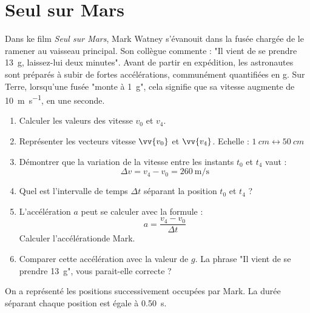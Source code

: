 \documentclass[a4paper,12pt,fleqn]{scrartcl}%
\begin{document}
\newpage
\section{Seul sur Mars}
Dans ke film \textit{Seul sur Mars}, Mark Watney s'évanouit dans la fusée chargée de le ramener au vaisseau principal. Son collègue commente : "Il vient de se prendre \SI{13}{g}, laissez-lui deux minutes". Avant de partir en expédition, les astronautes sont préparés à subir de fortes accélérations, communément quantifiées en \unit{\gram}. Sur Terre, lorsqu'une fusée "monte à \SI{1}{g}", cela signifie que sa vitesse augmente de \SI{10}{\meter\per\second}, en une seconde.

\begin{question}
    \begin{minipage}{.48\linewidth}
        \begin{enumerate}
            \item Calculer les valeurs des vitesse $v_0$ et $v_4$.
            \item Représenter les vecteurs vitesse $\vv{v_0}$ et $\vv{v_4}$. Echelle : $\SI{1}{cm}\leftrightarrow\SI{50}{cm}$
            \item Démontrer que la variation de la vitesse entre les instants $t_0$ et $t_4$ vaut : $$\Delta v = v_4 -v_0 = \SI{260}{\meter\per\second} $$
            \item Quel est l'intervalle de temps $\Delta t$ séparant la position $t_0$ et $t_4$ ?
            \item L'accélération $a$ peut se calculer avec la formule : $$a = \dfrac{v_4-v_0}{\Delta t}$$ Calculer l'accélérationde Mark.
            \item Comparer cette accélération avec la valeur de $g$. La phrase "Il vient de se prendre \SI{13}{g}", vous parait-elle correcte ?
        \end{enumerate}
    \end{minipage}
    \begin{minipage}{.5\linewidth}
    \centering

    On a représenté les positions successivement occupées par Mark. La durée séparant chaque position est égale à \SI{0,50}{\second}.
    \end{minipage}
\end{question}

    
\end{document}
